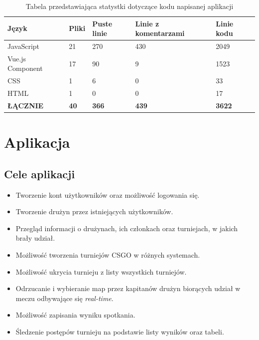 \documentclass[shortabstract]{iithesis}
\theoremstyle{definition} \newtheorem{definition}{Definicja}[]
\theoremstyle{remark} \newtheorem{remark}[definition]{Observation}
\theoremstyle{plain} \newtheorem{theorem}[definition]{Theorem}
\theoremstyle{plain} \newtheorem{lemma}[definition]{Lemma}
\begin{document}
\begin{table}[H]
    \begin{tabular}{|l|l|l|l|l|}
    \hline
    \textbf{Język}   & \textbf{Pliki} & \textbf{Puste linie} & \textbf{Linie z komentarzami} & \textbf{Linie kodu} \\ \hline
    JavaScript       & 21             & 270                  & 430                           & 2049                \\ \hline
    Vue.js Component & 17             & 90                   & 9                             & 1523                \\ \hline
    CSS              & 1              & 6                    & 0                             & 33                  \\ \hline
    HTML             & 1              & 0                    & 0                             & 17                  \\ \hline
    \textbf{ŁĄCZNIE} & \textbf{40}    & \textbf{366}         & \textbf{439}                  & \textbf{3622}       \\ \hline
    \end{tabular}
    \caption{\label{tab:code-lines}Tabela przedstawiająca statystki dotyczące kodu napisanej aplikacji}
\end{table}

\chapter{Aplikacja}
\section{Cele aplikacji}

\begin{itemize}
    \item Tworzenie kont użytkowników oraz możliwość logowania się.
    \item Tworzenie drużyn przez istniejących użytkowników.
    \item Przegląd informacji o drużynach, ich członkach oraz turniejach, w jakich brały udział.
    \item Możliwość tworzenia turniejów CSGO w różnych systemach.
    \item Możliwość ukrycia turnieju z listy wszystkich turniejów.
    \item Odrzucanie i wybieranie map przez kapitanów drużyn biorących udział w meczu odbywające się \textit{real-time}.
    \item Możliwość zapisania wyniku spotkania.
    \item Śledzenie postępów turnieju na podstawie listy wyników oraz tabeli.
\end{itemize}
\end{document}
